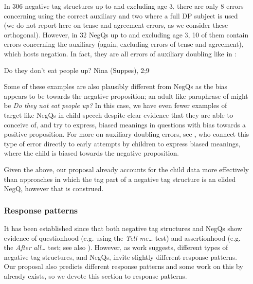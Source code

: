 \documentclass[output=paper,colorlinks,citecolor=brown]{langscibook}
\begin{document}
In 306 negative tag structures up to and excluding age 3, there are only 8 errors concerning using the correct auxiliary and two where a full DP subject is used (we do not report here on tense and agreement errors, as we consider these orthogonal). However, in 32 NegQs up to and excluding age 3, 10 of them contain errors concerning the auxiliary (again, excluding errors of tense and agreement), which hosts negation. In fact, they are all errors of auxiliary doubling like in :

\ea Do they don't eat people up? \phantom{a} \hfill	Nina (Suppes), 2;9 \label{4:eat}
\z
{}

Some of these examples are also plausibly different from NegQs as the bias appears to be towards the negative proposition; an adult-like paraphrase of  might be \textit{Do they not eat people up? }In this case, we have even fewer examples of target-like NegQs in child speech despite clear evidence that they are able to conceive of, and try to express, biased meanings in questions with bias towards a positive proposition. For more on auxiliary doubling errors, see \citet{woodsroeper2020}, who connect this type of error directly to early attempts by children to express biased meanings, where the child is biased towards the negative proposition.  

Given the above, our proposal already accounts for the child data more effectively than approaches in which the tag part of a negative tag structure is an elided NegQ, however that is construed. 

\subsubsection{Response patterns}\label{sect:strengthspatterns}
It has been established since \citet{sadock1971,sadock1974} that both negative tag structures and NegQs show evidence of questionhood (e.g. using the \textit{Tell me\ldots} test) and assertionhood (e.g. the \textit{After all\ldots} test; see also \citealt{asherreese2007}). However, as  work suggests, different types of negative tag structures, and NegQs, invite slightly different response patterns. Our proposal also predicts different response patterns and some work on this by \citet{holmberg2016} already exists, so we devote this section to response patterns.
\end{document}
